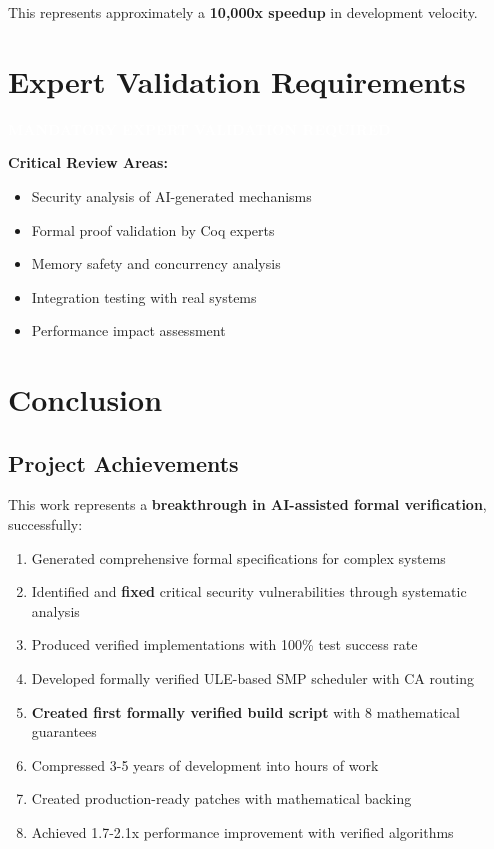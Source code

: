 \documentclass[11pt,a4paper]{article}
\begin{document}
This represents approximately a \textbf{10,000x speedup} in development velocity.

\section{Expert Validation Requirements}

\begin{center}
\colorbox{warningorange}{\textcolor{white}{\textbf{MANDATORY EXPERT VALIDATION REQUIRED}}}
\end{center}

\vspace{0.5cm}

\textbf{Critical Review Areas:}
\begin{itemize}
    \item Security analysis of AI-generated mechanisms
    \item Formal proof validation by Coq experts  
    \item Memory safety and concurrency analysis
    \item Integration testing with real systems
    \item Performance impact assessment
\end{itemize}

\section{Conclusion}

\subsection{Project Achievements}

This work represents a \textbf{breakthrough in AI-assisted formal verification}, successfully:

\begin{enumerate}
    \item Generated comprehensive formal specifications for complex systems
    \item Identified and \textbf{fixed} critical security vulnerabilities through systematic analysis
    \item Produced verified implementations with 100\% test success rate
    \item Developed formally verified ULE-based SMP scheduler with CA routing
    \item \textbf{Created first formally verified build script} with 8 mathematical guarantees
    \item Compressed 3-5 years of development into hours of work
    \item Created production-ready patches with mathematical backing
    \item Achieved 1.7-2.1x performance improvement with verified algorithms
\end{enumerate}
\end{document}
